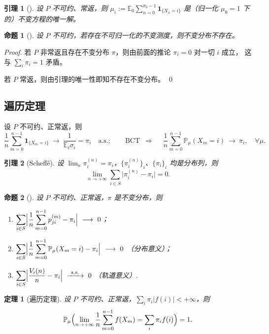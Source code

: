 \documentclass[lang=cn,10pt,newtx,thmcnt=chapter,mode=simple]{vividbook}
\providecommand{\E}{}\renewcommand{\E}{\mathbb{E}}
\providecommand{\Pp}{}\renewcommand{\Pp}{\mathbb{P}}
\newcommand{\ind}[1]{\mathbf{1}_{\{#1\}}}
\newcommand{\darr}{\;\Rightarrow\;}
\theoremstyle{vividthm}
\newtheorem*{vividtheorem}{定理}
\newtheorem*{vividlemma}{引理}
\newtheorem*{vividproposition}{命题}
\theoremstyle{vividdef}
\theoremstyle{vividexa}
\theoremstyle{vividrem}
\renewenvironment{theorem}[1][]{\begin{vividtheorem}[#1]}{\end{vividtheorem}}
\renewenvironment{lemma}[1][]{\begin{vividlemma}[#1]}{\end{vividlemma}}
\renewenvironment{proposition}[1][]{\begin{vividproposition}[#1]}{\end{vividproposition}}
\begin{document}
\begin{lemma}
设 $P$ 不可约、常返，则 $\mu_i:=\E_0\sum_{n=0}^{\sigma_0-1}\ind{X_n=i}$
是（归一化 $\mu_0=1$ 下的）不变方程的唯一解。
\end{lemma}

\begin{proposition}
设 $P$ 不可约，若存在不可归一化的不变测度，则不变分布不存在。
\end{proposition}

\begin{proof}
若 $P$ 非常返且存在不变分布 $\pi$，则由前面的推论 $\pi_i=0$ 对一切 $i$ 成立，
这与 $\sum_i\pi_i=1$ 矛盾。

若 $P$ 常返，则由引理的唯一性即知不存在不变分布。 \qed
\end{proof}

\subsection{遍历定理}

设 $P$ 不可约、正常返，则
\[
\frac1n\sum_{m=0}^{n-1}\ind{X_m=i}\ \longrightarrow\ \frac{1}{\E_i\sigma_i}=\pi_i
\quad\text{a.s.};
\qquad
\text{BCT}\ \darr\quad
\frac1n\sum_{m=0}^{n-1}\Pp_\mu(X_m=i)\ \longrightarrow\ \pi_i,\quad\forall\mu .
\]

\begin{lemma}[Scheffé]
设 $\lim_n\pi_i^{(n)}=\pi_i$，$\{\pi_i^{(n)}\}_i$、$\{\pi_i\}_i$ 均是分布列，则
\[
\lim_{n\to+\infty}\sum_{i\in S}\bigl|\pi_i^{(n)}-\pi_i\bigr|=0 .
\]
\end{lemma}

\begin{proposition}
设 $P$ 不可约、正常返，$\pi$ 是不变分布，则
\begin{enumerate}
  \item $\displaystyle\sum_{i\in S}\Bigl|\frac1n\sum_{m=0}^{n-1}p_{ji}^{(m)}-\pi_i\Bigr|\ \longrightarrow\ 0$；
  \item $\displaystyle\sum_{i\in S}\Bigl|\frac1n\sum_{m=0}^{n-1}\Pp_\mu(X_m=i)-\pi_i\Bigr|\ \longrightarrow\ 0$
        \quad（分布意义）；
  \item $\displaystyle\sum_{i\in S}\Bigl|\frac{V_i(n)}{n}-\pi_i\Bigr|\ \xrightarrow{\ \text{a.s.}\ }\ 0$
        \quad（轨道意义）.
\end{enumerate}
\end{proposition}

\begin{theorem}[遍历定理]
设 $P$ 不可约、正常返，$\sum_i\pi_i|f(i)|<+\infty$，则
\[
\Pp_\mu\Bigl(\lim_{n\to+\infty}\frac1n\sum_{m=0}^{n-1}f(X_m)=\sum_i\pi_if(i)\Bigr)=1 .
\]
\end{theorem}
\end{document}
